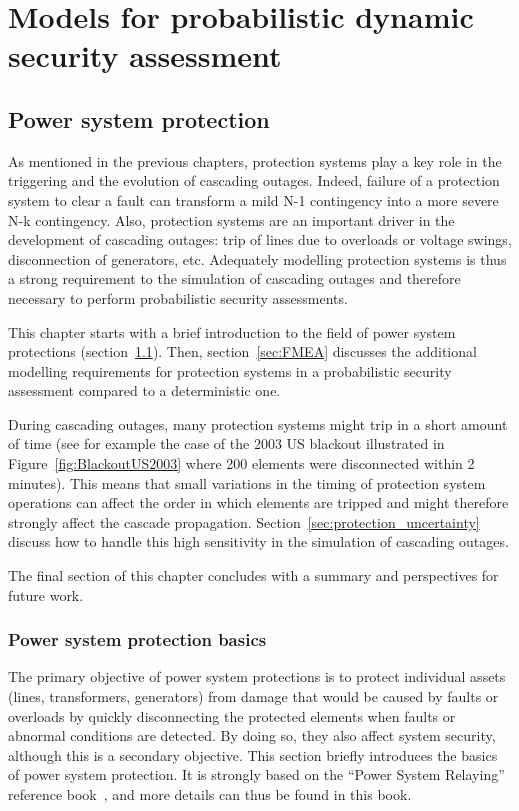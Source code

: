 \part{Models for probabilistic dynamic security assessment}
\label{part:models}
\chapter{Power system protection}
\label{ch:protections}
\minitoc

As mentioned in the previous chapters, protection systems play a key role in the triggering and the evolution of cascading outages. Indeed, failure of a protection system to clear a fault can transform a mild N-1 contingency into a more severe N-k contingency. Also, protection systems are an important driver in the development of cascading outages: trip of lines due to overloads or voltage swings, disconnection of generators, etc. Adequately modelling protection systems is thus a strong requirement to the simulation of cascading outages and therefore necessary to perform probabilistic security assessments.

This chapter starts with a brief introduction to the field of power system protections (section~\ref{sec:protection_basics}). Then, section~\ref{sec:FMEA} discusses the additional modelling requirements for protection systems in a probabilistic security assessment compared to a deterministic one.

During cascading outages, many protection systems might trip in a short amount of time (see for example the case of the 2003 US blackout illustrated in Figure~\ref{fig:BlackoutUS2003} where 200 elements were disconnected within 2 minutes). This means that small variations in the timing of protection system operations can affect the order in which elements are tripped and might therefore strongly affect the cascade propagation. Section~\ref{sec:protection_uncertainty} discuss how to handle this high sensitivity in the simulation of cascading outages.

The final section of this chapter concludes with a summary and perspectives for future work.


\section{Power system protection basics}
\label{sec:protection_basics}

The primary objective of power system protections is to protect individual assets (lines, transformers, generators) from damage that would be caused by faults or overloads by quickly disconnecting the protected elements when faults or abnormal conditions are detected. By doing so, they also affect system security, although this is a secondary objective. This section briefly introduces the basics of power system protection. It is strongly based on the ``Power System Relaying'' reference book~\cite{HorowitzBook}, and more details can thus be found in this book.

